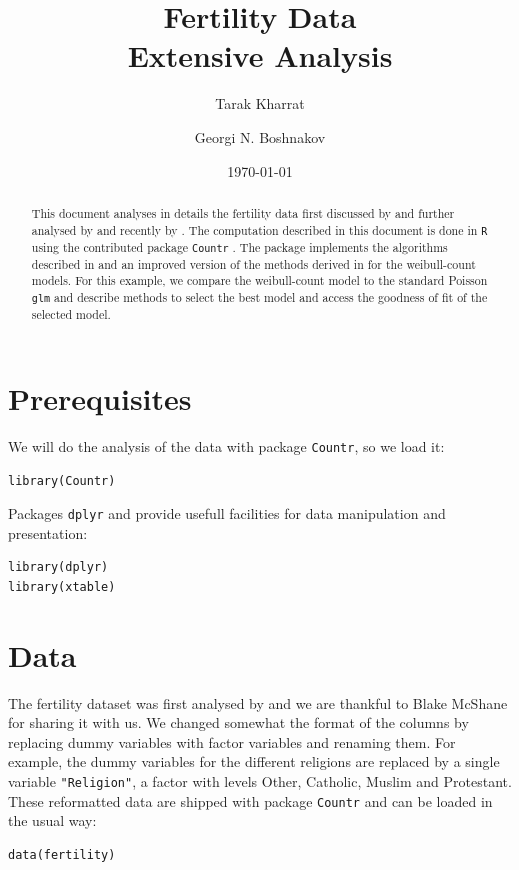 \documentclass[a4paper,twoside,11pt]{article}
\author[1]{Tarak Kharrat}
\author[2]{Georgi N. Boshnakov}
\affil[1]{Salford Business School, University of Salford, UK.}
\affil[2]{School of Mathematics, University of Manchester, UK.}
\date{\today}
\title{Fertility Data\\\medskip
\large Extensive Analysis}
\begin{document}
\maketitle
\begin{abstract}
This document analyses in details the fertility data first discussed by
\citet{winkelmann1995duration} and further analysed by \citet{mcshane2008count}
and recently by \citet{baker2017event}.  The computation described in this
document is done in \texttt{R} \citep{Rcore} using the contributed package \texttt{Countr}
\citep{RpackageCountr}. The package implements the algorithms described in
\citet{baker2017event} and an improved version of the methods derived in
\citet{mcshane2008count} for the weibull-count models. For this example, we
compare the weibull-count model to the standard Poisson \texttt{glm} and describe
methods to select the best model and access the goodness of fit of the selected
model.
\end{abstract}


\section{Prerequisites}
\label{sec:org6fc46dd}

We will do the analysis of the data with package \texttt{Countr}, so we load it:
\begin{verbatim}
library(Countr)
\end{verbatim}

Packages \texttt{dplyr} \citep{dplyr2016} and \citep{xtable2016} provide usefull facilities
for data manipulation and presentation:
\begin{verbatim}
library(dplyr) 
library(xtable)
\end{verbatim}



\section{Data}
\label{sec:org94417ff}

The fertility dataset was first analysed by \citet{winkelmann1995duration} and
we are thankful to Blake McShane for sharing it with us. 
We changed somewhat the
format of the columns by replacing dummy variables with factor variables and
renaming them. For example, the dummy variables for the different religions are
replaced by a single variable \texttt{"Religion"}, a factor with levels Other,
Catholic, Muslim and Protestant. 
These reformatted data are shipped with package \texttt{Countr} and can
be loaded in the usual way:
\begin{verbatim}
data(fertility)
\end{verbatim}
\end{document}
